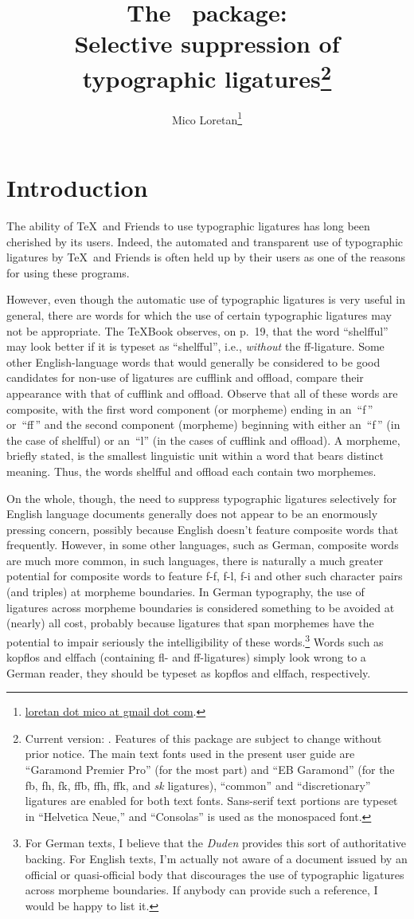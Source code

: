 \documentclass[12pt]{article}
\title{The \pname\ package: \\
Selective suppression of typographic ligatures\thanks{
Current version: \pversion. Features of this package are subject to change without prior notice. The main text fonts used in the present user guide are \enquote{Garamond Premier Pro} (for the most part) and \enquote{EB Garamond} (for the \bgroup\ebg \mbox{fb}, \mbox{fh}, \mbox{fk}, \mbox{ffb}, \mbox{ffh},  \mbox{ffk}, and \emph{sk} ligatures\egroup), \enquote{common} and \enquote{discretionary} ligatures are enabled for both text fonts. Sans-serif text portions are typeset in \enquote{Helvetica Neue,} and \enquote{Consolas} is used as the monospaced font.}}
\author{Mico Loretan\thanks{
\href{mailto:loretan.mico@gmail.com}{loretan dot mico at gmail dot com}.}}
\date{\pdate}
\begin{document}
\VerbatimFootnotes

\maketitle
\thispagestyle{empty}

\tableofcontents

\section{Introduction}

The ability of \TeX\ and Friends to use typographic ligatures has long been cherished by its users. Indeed, the automated and transparent use of typographic ligatures by \TeX\ and Friends is often held up by their users as one of the reasons for using these programs.

However, even though the automatic use of typographic ligatures is very useful in general, there are words for which the use of certain typographic ligatures may not be appropriate. The \TeX Book observes, on p.~19, that the word \enquote{\mbox{shelfful}} may look better if it is typeset as \enquote{shelfful}, i.e., \emph{without} the ff-ligature. Some other English-language words that would generally be considered to be good candidates for non-use of ligatures are \mbox{cufflink} and \mbox{offload}, compare their appearance with that of cufflink and offload. Observe that all of these words are composite, with the first word component (or morpheme) ending in an~\enquote{f\,} or~\enquote{ff\,} and the second component (morpheme) beginning with either an~\enquote{f\,} (in the case of shelfful) or an~\enquote{l} (in the cases of cufflink and offload). A morpheme, briefly stated, is the smallest linguistic unit within a word that bears distinct meaning. Thus, the words shelfful and offload each contain two morphemes. 

On the whole, though, the need to suppress typographic ligatures selectively for English language documents  generally does not appear to be an enormously pressing concern, possibly because English doesn't feature composite words that frequently. However, in some other languages, such as German, composite words are much more common, in such languages, there is naturally a much greater potential for composite words to feature f-f, f-l, f-i and other such character pairs (and triples) at morpheme boundaries. In German typography, the use of ligatures across morpheme boundaries is considered something to be avoided at (nearly) all cost, probably because ligatures that span morphemes have the potential to impair seriously the intelligibility of these words.\footnote{For German texts, I believe that the \emph{Duden} provides this sort of authoritative backing. For English texts, I'm actually not aware of a document issued by an official or quasi-official body that discourages the use of typographic ligatures across morpheme boundaries. If anybody can provide such a reference, I would be happy to list it.} Words such as \mbox{kopflos} and \mbox{elffach} (containing fl- and ff-ligatures) simply look wrong to a German reader, they should be typeset as kopflos and elffach, respectively.
\end{document}
